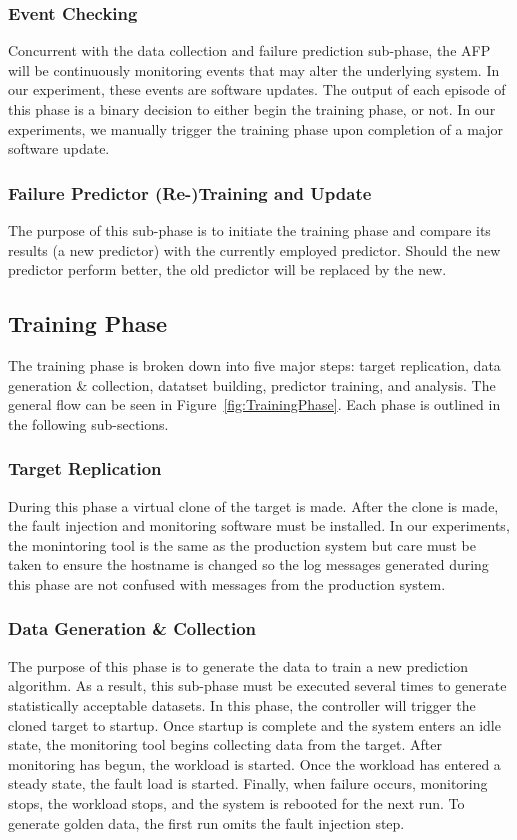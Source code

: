 \subsubsection{Event Checking}
Concurrent with the data collection and failure prediction sub-phase, the AFP
will be continuously monitoring events that may alter the underlying system.
In our experiment, these events are software updates.  The output of each
episode of this phase is a binary decision to either begin the training phase,
or not.  In our experiments, we manually trigger the training phase upon
completion of a major software update.

\subsubsection{Failure Predictor (Re-)Training and Update}
The purpose of this sub-phase is to initiate the training phase and compare its
results (a new predictor) with the currently employed predictor.  Should the
new predictor perform better, the old predictor will be replaced by the new.

\subsection{Training Phase}
The training phase is broken down into five major steps:  target replication,
data generation \& collection, datatset building, predictor training, and
analysis.  The general flow can be seen in Figure~\ref{fig:TrainingPhase}.
Each phase is outlined in the following sub-sections.

\figTrainingPhase

\subsubsection{Target Replication}
During this phase a virtual clone of the target is made.  After the clone is
made, the fault injection and monitoring software must be installed.  In our
experiments, the monintoring tool is the same as the production system but care
must be taken to ensure the hostname is changed so the log messages generated
during this phase are not confused with messages from the production system.

\subsubsection{Data Generation \& Collection}
The purpose of this phase is to generate the data to train a new prediction
algorithm.  As a result, this sub-phase must be executed several times to
generate statistically acceptable datasets.  In this phase, the controller will
trigger the cloned target to startup.  Once startup is complete and the system
enters an idle state, the monitoring tool begins collecting data from the
target.  After monitoring has begun, the workload is started.  Once the
workload has entered a steady state, the fault load is started.  Finally, when
failure occurs, monitoring stops, the workload stops, and the system is
rebooted for the next run.  To generate golden data, the first run omits the
fault injection step.

